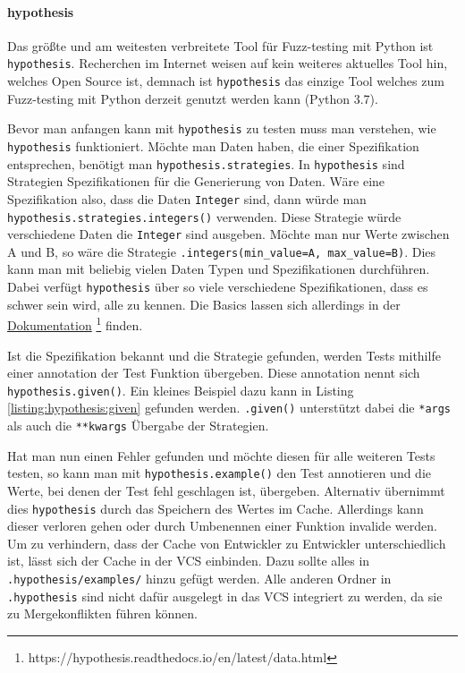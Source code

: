 \paragraph{hypothesis}\label{python-tools:hypothesis}\mbox{}
\newline
Das größte und am weitesten verbreitete Tool für Fuzz-testing mit Python ist
\lstinline{hypothesis}. Recherchen im Internet weisen auf kein weiteres 
aktuelles Tool hin, welches Open Source ist, demnach ist \lstinline{hypothesis} 
das einzige Tool welches zum Fuzz-testing mit Python derzeit genutzt werden 
kann (Python 3.7).

Bevor man anfangen kann mit \lstinline{hypothesis} zu testen muss man verstehen,
wie \lstinline{hypothesis} funktioniert. Möchte man Daten haben, die einer
Spezifikation entsprechen, benötigt man \lstinline{hypothesis.strategies}. In
\lstinline{hypothesis} sind Strategien Spezifikationen für die Generierung von
Daten. Wäre eine Spezifikation also, dass die Daten \lstinline{Integer} sind, 
dann würde man \lstinline{hypothesis.strategies.integers()} verwenden. Diese 
Strategie würde verschiedene Daten die \lstinline{Integer} sind ausgeben. 
Möchte man nur Werte zwischen A und B, so wäre die Strategie 
\lstinline{.integers(min_value=A, max_value=B)}. Dies kann man mit beliebig
vielen Daten Typen und Spezifikationen durchführen. Dabei verfügt 
\lstinline{hypothesis} über so viele verschiedene Spezifikationen, dass es 
schwer sein wird, alle zu kennen. Die Basics lassen sich allerdings in der
\href{https://hypothesis.readthedocs.io/en/latest/data.html}{Dokumentation}
\footnote{https://hypothesis.readthedocs.io/en/latest/data.html} finden.

Ist die Spezifikation bekannt und die Strategie gefunden, werden Tests mithilfe 
einer \Gls{annotation} der Test Funktion übergeben. Diese \Gls{annotation} 
nennt sich \lstinline{hypothesis.given()}. Ein kleines Beispiel dazu kann in 
Listing \ref{listing:hypothesis:given} gefunden werden. \lstinline{.given()} 
unterstützt dabei die \lstinline{*args} als auch die \lstinline{**kwargs} 
Übergabe der Strategien.

Hat man nun einen Fehler gefunden und möchte diesen für alle weiteren Tests 
testen, so kann man mit \lstinline{hypothesis.example()} den Test annotieren 
und die Werte, bei denen der Test fehl geschlagen ist, übergeben. Alternativ 
übernimmt dies \lstinline{hypothesis} durch das Speichern des Wertes im Cache. 
Allerdings kann dieser verloren gehen oder durch Umbenennen einer Funktion 
invalide werden. Um zu verhindern, dass der Cache von Entwickler zu Entwickler 
unterschiedlich ist, lässt sich der Cache in der VCS einbinden. Dazu sollte 
alles in \lstinline{.hypothesis/examples/} hinzu gefügt werden. Alle anderen 
Ordner in \lstinline{.hypothesis} sind nicht dafür ausgelegt in das VCS 
integriert zu werden, da sie zu Mergekonflikten führen können.

